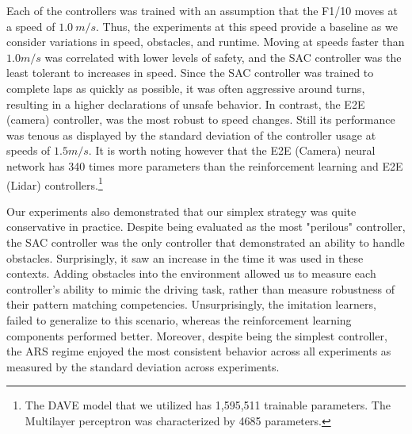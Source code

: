 \documentclass[manuscript,screen,review]{acmart}
\begin{document}



Each of the controllers was trained with an assumption that the F1/10 moves at a speed of $1.0 \ m/s$. Thus, the experiments at this speed provide a baseline as we consider variations in speed, obstacles, and runtime. Moving at speeds faster than $1.0 m/s$ was correlated with lower levels of safety, and the SAC controller was the least tolerant to increases in speed. Since the SAC controller was trained to complete laps as quickly as possible, it was often aggressive around turns, resulting in a higher declarations of unsafe behavior. In contrast, the E2E (camera) controller, was the most robust to speed changes. Still its performance was tenous as displayed by the standard deviation of the controller usage at speeds of $1.5 m/s$. It is worth noting however that the E2E (Camera) neural network has 340 times more parameters than the reinforcement learning and E2E (Lidar) controllers.\footnote{The DAVE model that we utilized has 1,595,511 trainable parameters. The Multilayer perceptron was characterized by 4685 parameters.}


Our experiments also demonstrated that our simplex strategy was quite conservative in practice. Despite being evaluated as the most "perilous" controller, the SAC controller was the only controller that demonstrated an ability to handle obstacles. Surprisingly, it saw an increase in the time it was used in these contexts. Adding obstacles into the environment allowed us to measure each controller's ability to mimic the driving task, rather than measure robustness of their pattern matching competencies. Unsurprisingly, the imitation learners, failed to generalize to this scenario, whereas the reinforcement learning components performed better. Moreover, despite being the simplest controller, the ARS regime enjoyed the most consistent behavior across all experiments as measured by the standard deviation across experiments.
\end{document}
